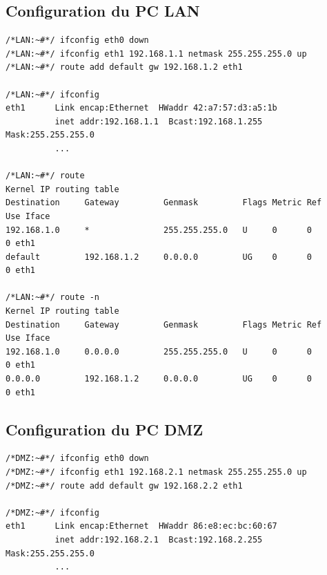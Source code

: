 \documentclass[frenchb, 11pt]{article}
\begin{document}
\subsection{Configuration du PC LAN}
\begin{lstlisting}
/*LAN:~#*/ ifconfig eth0 down
/*LAN:~#*/ ifconfig eth1 192.168.1.1 netmask 255.255.255.0 up
/*LAN:~#*/ route add default gw 192.168.1.2 eth1

/*LAN:~#*/ ifconfig
eth1      Link encap:Ethernet  HWaddr 42:a7:57:d3:a5:1b
          inet addr:192.168.1.1  Bcast:192.168.1.255  Mask:255.255.255.0
          ...

/*LAN:~#*/ route
Kernel IP routing table
Destination     Gateway         Genmask         Flags Metric Ref    Use Iface
192.168.1.0     *               255.255.255.0   U     0      0        0 eth1
default         192.168.1.2     0.0.0.0         UG    0      0        0 eth1

/*LAN:~#*/ route -n
Kernel IP routing table
Destination     Gateway         Genmask         Flags Metric Ref    Use Iface
192.168.1.0     0.0.0.0         255.255.255.0   U     0      0        0 eth1
0.0.0.0         192.168.1.2     0.0.0.0         UG    0      0        0 eth1
\end{lstlisting}

\subsection{Configuration du PC DMZ}
\begin{lstlisting}
/*DMZ:~#*/ ifconfig eth0 down
/*DMZ:~#*/ ifconfig eth1 192.168.2.1 netmask 255.255.255.0 up
/*DMZ:~#*/ route add default gw 192.168.2.2 eth1

/*DMZ:~#*/ ifconfig
eth1      Link encap:Ethernet  HWaddr 86:e8:ec:bc:60:67
          inet addr:192.168.2.1  Bcast:192.168.2.255  Mask:255.255.255.0
          ...
\end{lstlisting}
\newpage
\end{document}
